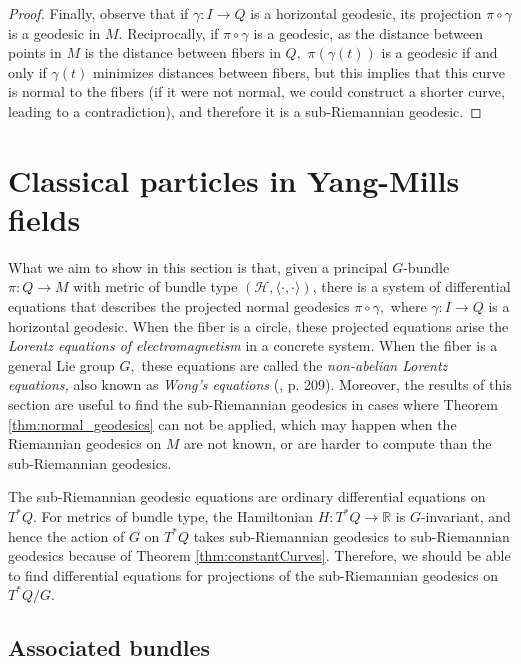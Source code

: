 \documentclass[12pt, letterpaper, reqno]{amsart}
\theoremstyle{definition}
\theoremstyle{plain}
\theoremstyle{remark}
\begin{document}
\begin{proof}
	Finally, observe that if $ \gamma: I \rightarrow Q $ is a horizontal geodesic, its projection $ \pi\circ\gamma $ is a geodesic in $ M. $ Reciprocally, if $ \pi\circ\gamma $ is a geodesic, as the distance between points in $ M $ is the distance between fibers in $ Q, $ $ \pi(\gamma(t) ) $ is a geodesic if and only if $\gamma(t)$ minimizes distances between fibers, but this implies that this curve is normal to the fibers (if it were not normal, we could construct a shorter curve, leading to a contradiction), and therefore it is a sub-Riemannian geodesic.  
\end{proof}

\section{Classical particles in Yang-Mills fields}%
\label{sec:classical_particles_in_yang_mills_fields}


What we aim to show in this section is that, given a principal $ G $-bundle $ \pi:Q \rightarrow M $ with metric of bundle type $ (\mathcal{H}, \langle\cdot, \cdot \rangle) $,   there is a system of differential equations that describes the projected normal geodesics $ \pi\circ\gamma, $ where $ \gamma: I \rightarrow Q $ is a horizontal geodesic. When the fiber is a circle, these projected equations arise the \textit{Lorentz equations of electromagnetism} in a concrete system. When the fiber is a general Lie group $ G, $ these equations are called the \textit{non-abelian Lorentz equations,} also known as \textit{Wong's equations} (\cite{montgomery2002tour}, p. 209). Moreover, the results of this section are useful to find the sub-Riemannian geodesics in cases where Theorem \ref{thm:normal_geodesics} can not be applied, which may happen when the Riemannian geodesics on $ M $ are not known, or are harder to compute than the sub-Riemannian geodesics.

The sub-Riemannian geodesic equations are ordinary differential equations on $ T^*Q. $ For metrics of bundle type, the Hamiltonian $ H: T^*Q \rightarrow  \mathbb{R} $ is $ G $-invariant, and hence the action of $ G $ on $ T^*Q $ takes sub-Riemannian geodesics to sub-Riemannian geodesics because of Theorem \ref{thm:constantCurves}. Therefore, we should be able to find differential equations for projections of the sub-Riemannian geodesics on $ T^*Q/G. $ 

 \subsection{Associated bundles}%
 \label{sub:associated_bundles}
\end{document}
